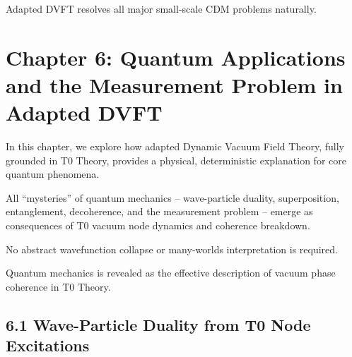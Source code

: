 	\begin{table}[htbp]
		\centering
		\caption{Galactic scale predictions}
		\label{tab:galactic}
	\end{table}
	
	Adapted DVFT resolves all major small-scale CDM problems naturally.
	
	\section{Chapter 6: Quantum Applications and the Measurement Problem in Adapted DVFT}
	
	In this chapter, we explore how adapted Dynamic Vacuum Field Theory, fully grounded in T0 Theory, provides a physical, deterministic explanation for core quantum phenomena.
	
	All ``mysteries'' of quantum mechanics – wave-particle duality, superposition, entanglement, decoherence, and the measurement problem – emerge as consequences of T0 vacuum node dynamics and coherence breakdown.
	
	No abstract wavefunction collapse or many-worlds interpretation is required.
	
	Quantum mechanics is revealed as the effective description of vacuum phase coherence in T0 Theory.
	
	\subsection{6.1 Wave-Particle Duality from T0 Node Excitations}
	
